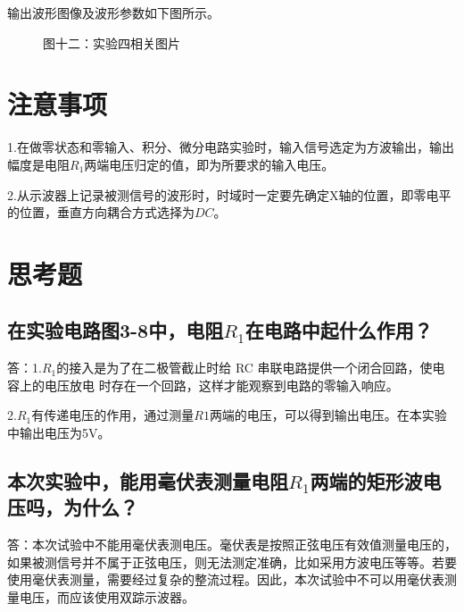 \documentclass[a4paper]{article}
\begin{document}
    {{输出波形图像及波形参数如下图所示。}}

    \begin{figure}[htb]
        \centering
        \centering
        \caption{\small 图十二：实验四相关图片}
    \end{figure}

    \vspace{1cm}


    \section{注意事项}\label{sec:6}
    \noindent
    {1.在做零状态和零输入、积分、微分电路实验时，输入信号选定为方波输出，输出幅度是电阻$R_{1}$两端电压归定的值，即为所要求的输入电压。}

    \noindent
    {2.从示波器上记录被测信号的波形时，时域时一定要先确定X轴的位置，即零电平的位置，垂直方向耦合方式选择为$DC$。}

    \vspace{1cm}


    \section{思考题}\label{sec:7}

    \subsection{在实验电路图3-8中，电阻$R_{1}$在电路中起什么作用？}\label{subsec:q1}
    \noindent
    {答：1.$R_{1}$的接入是为了在二极管截止时给 RC 串联电路提供一个闭合回路，使电容上的电压放电 时存在一个回路，这样才能观察到电路的零输入响应。}

    {2.$R_{1}$有传递电压的作用，通过测量$R1$两端的电压，可以得到输出电压。在本实验中输出电压为5V。}

    \subsection{本次实验中，能用毫伏表测量电阻$R_{1}$两端的矩形波电压吗，为什么？}\label{subsec:q2}
    \noindent
    {答：本次试验中不能用毫伏表测电压。毫伏表是按照正弦电压有效值测量电压的，如果被测信号并不属于正弦电压，则无法测定准确，比如采用方波电压等等。若要使用毫伏表测量，需要经过复杂的整流过程。因此，本次试验中不可以用毫伏表测量电压，而应该使用双踪示波器。}
\end{document}
